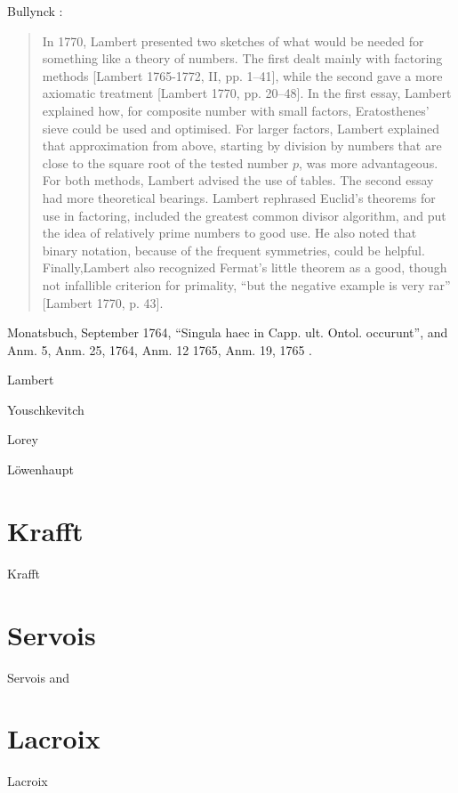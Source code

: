 \documentclass{amsart}
\begin{document}
Bullynck \cite[pp.~164--165]{bullynck}:

\begin{quote}
In 1770, Lambert presented two sketches of what would be needed for
something like a theory of numbers. The first dealt mainly with factoring methods [Lambert 1765-1772, II, pp. 1–41], while the second gave a
more axiomatic treatment [Lambert 1770, pp. 20–48]. In the first essay,
Lambert explained how, for composite number with small factors, Eratosthenes'
sieve could be used and optimised. For larger factors, Lambert
explained that approximation from above, starting by division by numbers
that are close to the square root of the tested number $p$, was more advantageous.
For both methods, Lambert advised the use of tables. The
second essay had more theoretical bearings. Lambert rephrased Euclid's
theorems for use in factoring, included the greatest common divisor algorithm, and
put the idea of relatively prime numbers to good use. He also
noted that binary notation, because of the frequent symmetries, could be
helpful. Finally,Lambert also recognized Fermat’s little theorem as a good,
though not infallible criterion for primality, ``but the negative example is
very rar'' [Lambert 1770, p. 43]. 
\end{quote}

Monatsbuch, September 1764, ``Singula haec in Capp. ult. Ontol. occurunt'', and Anm. 5, Anm. 25, 1764, Anm. 12 1765, Anm. 19, 1765 \cite{monatsbuch}.

Lambert  \cite[pp.~506--511, \S 875]{anlage}

Youschkevitch \cite{youschkevitch}

Lorey \cite[p.~23]{lorey}

L\"owenhaupt \cite[p.~32]{lowenhaupt}


\section{Krafft}
Krafft \cite[pp.~244--245]{krafft}


\section{Servois}
Servois \cite{servoisessai} and \cite[p.~166]{servois}


\section{Lacroix}
Lacroix \cite[pp.~465--466, \S 1195]{lacroixIII}
\end{document}
